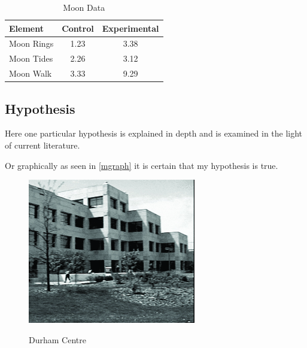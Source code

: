 \begin{table}[h!tb] \centering
    \caption{Moon Data}
    \label{data}
    \begin{tabular}{lcc} \hline
        \textbf{Element} & \textbf{Control} & \textbf{Experimental} \\ \hline
        Moon Rings       & 1.23             & 3.38                  \\
        Moon Tides       & 2.26             & 3.12                  \\
        Moon Walk        & 3.33             & 9.29                  \\ \hline
    \end{tabular}
\end{table}

\subsection{Hypothesis}

Here one particular hypothesis is explained in depth
and is examined in the light of current literature.

Or graphically as seen in \autoref{mgraph}
it is certain that my hypothesis is true.

\begin{figure}[h!tb] \centering

    \includegraphics[alt={Here is some alt text}]{Images/dc5}

    \caption{Durham Centre}
    \label{mgraph}
\end{figure}

